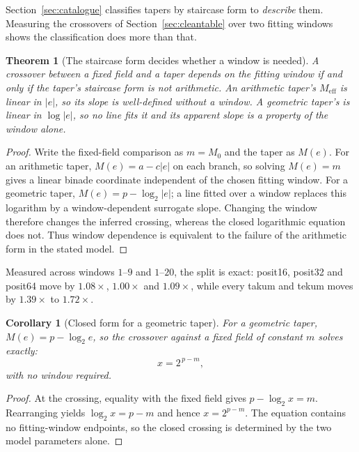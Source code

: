 \documentclass[11pt]{article}
\newtheorem{theorem}{Theorem}
\newtheorem{corollary}{Corollary}
\theoremstyle{definition}
\begin{document}
\label{sec:formprescribes}

Section~\ref{sec:catalogue} classifies tapers by staircase form to \emph{describe}
them. Measuring the crossovers of Section~\ref{sec:cleantable} over two fitting
windows shows the classification does more than that.

\begin{theorem}[The staircase form decides whether a window is needed]
\label{thm:formwindow}
A crossover between a fixed field and a taper depends on the fitting window if
and only if the taper's staircase form is not arithmetic. An arithmetic taper's
$M_{\mathrm{eff}}$ is linear in $|e|$, so its slope is well-defined without a
window. A geometric taper's is linear in $\log|e|$, so no line fits it and its
apparent slope is a property of the window alone.
\end{theorem}
\begin{proof}
Write the fixed-field comparison as $m=M_0$ and the taper as $M(e)$.
For an arithmetic taper, $M(e)=a-c|e|$ on each branch, so solving
$M(e)=m$ gives a linear binade coordinate independent of the chosen fitting
window.  For a geometric taper, $M(e)=p-\log_2|e|$; a line fitted over
a window replaces this logarithm by a window-dependent surrogate slope.
Changing the window therefore changes the inferred crossing, whereas the
closed logarithmic equation does not.  Thus window dependence is equivalent
to the failure of the arithmetic form in the stated model.
\end{proof}

Measured across windows $1$--$9$ and $1$--$20$, the split is exact: posit16,
posit32 and posit64 move by $1.08\times$, $1.00\times$ and $1.09\times$, while
every takum and tekum moves by $1.39\times$ to $1.72\times$.

\begin{corollary}[Closed form for a geometric taper]
\label{cor:geomcross}
For a geometric taper, $M(e) = p - \log_2 e$, so the crossover against a fixed
field of constant $m$ solves exactly:
\[
  x = 2^{\,p-m},
\]
with no window required.
\end{corollary}
\begin{proof}
At the crossing, equality with the fixed field gives
$p-\log_2 x=m$.  Rearranging yields $\log_2 x=p-m$ and hence
$x=2^{p-m}$.  The equation contains no fitting-window endpoints, so the
closed crossing is determined by the two model parameters alone.
\end{proof}
\end{document}

